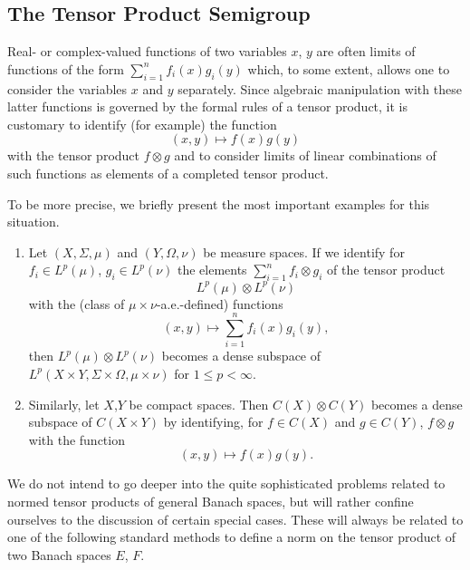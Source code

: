 \subsection{The Tensor Product Semigroup}\label{subsec:a1-3.8}%
Real- or complex-valued functions of two variables $x$, $y$ are often limits of functions of the form 
$\sum_{i=1}^{n} f_{i}(x)g_{i}(y)$ which, to some extent, allows one to consider the variables $x$ and $y$ separately.
Since algebraic manipulation with these latter functions is governed by the formal rules of a tensor product, it is customary to identify (for example) the function
\[
    (x,y) \mapsto f(x)g(y)
\]
with the tensor product $f \otimes g$ and to consider limits of linear combinations of such functions as elements of a completed tensor product.

To be more precise, we briefly present the most important examples for this situation.
\begin{examples*}\label{ex:a1-5.1}
\begin{enumerate}[\upshape(i), wide, labelindent=.25em]

\item
Let $(X,\Sigma,\mu)$ and $(Y,\Omega,\nu)$ be measure spaces. 
If we identify for $f_{i} \in L^{p}(\mu)$, $g_{i} \in L^{p}(\nu)$ the elements $\sum_{i=1}^{n} f_{i} \otimes g_{i}$ of the tensor product
\[
    L^{p}(\mu) \otimes L^{p}(\nu)
\]
with the (class of\/ $\mu \times \nu$-a.e.-defined) functions
\[
    (x,y) \mapsto \sum_{i=1}^{n} f_{i}(x)g_{i}(y) ,
\]
then $L^{p}(\mu) \otimes L^{p}(\nu)$ becomes a dense subspace of\/ $L^{p}(X\times Y,\Sigma\times\Omega,\mu\times\nu)$ for $1 \leq p < \infty$.

\item
Similarly, let $X$,$Y$ be compact spaces. Then $C(X) \otimes C(Y)$ becomes a dense subspace of\/ $C(X\times Y)$ by identifying, for $f \in C(X)$ and $g \in C(Y)$, $f \otimes g$ with the function
\[
    (x,y) \mapsto f(x)g(y) .
\]
\end{enumerate}
\end{examples*}
We do not intend to go deeper into the quite sophisticated problems related to normed tensor products of general Banach spaces, but will rather confine ourselves to the discussion of certain special cases.
These will always be related to one of the following standard methods to define a norm on the tensor product of two Banach spaces $E$, $F$.

